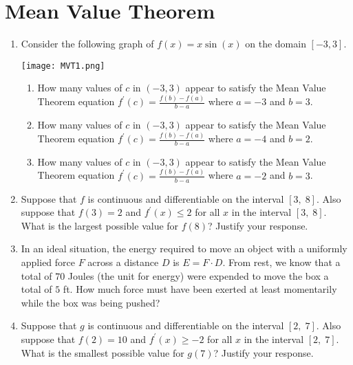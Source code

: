 \documentclass[12pt]{report}
\begin{document}
\newcommand{\less}{\textless}
\newcommand{\greater}{\textgreater}
\newcommand{\reals}{\mathbb{R}}
\newcommand{\integers}{\mathbb{Z}}
\newcommand{\rationals}{\mathbb{Q}}
\newcommand{\dsp}{\displaystyle}

\section*{Mean Value Theorem}

\begin{enumerate}

\item Consider the following graph of $f(x) = x\sin(x)$ on the domain $[-3, 3]$. 
\begin{center}
\texttt{[image: MVT1.png]}
\end{center}
\begin{enumerate}
\item How many values of $c$ in $(-3, 3)$ appear to satisfy the Mean Value Theorem equation \newline $\dsp f^\prime(c) = \frac{f(b)-f(a)}{b-a}$ where $a = -3$ and $b = 3$.

\item How many values of $c$ in $(-3, 3)$ appear to satisfy the Mean Value Theorem equation \newline $\dsp f^\prime(c) = \frac{f(b)-f(a)}{b-a}$ where $a = -4$ and $b = 2$.

\item How many values of $c$ in $(-3, 3)$ appear to satisfy the Mean Value Theorem equation \newline $\dsp f^\prime(c) = \frac{f(b)-f(a)}{b-a}$ where $a = -2$ and $b = 3$.
\end{enumerate}

\item  Suppose that $f$ is continuous and differentiable on the interval $[3, \; 8]$. Also suppose that $f(3) = 2$ and $f^\prime(x) \le 2$ for all $x$ in the interval $[3, \; 8]$. What is the largest possible value for $f(8)$? Justify your response.

\item In an ideal situation, the energy required to move an object with a uniformly applied force $F$ across a distance $D$ is $E=F\cdot D$. From rest, we know that a total of $70$ Joules (the unit for energy) were expended to move the box a total of $5$ ft. How much force must have been exerted at least momentarily while the box was being pushed?

\item  Suppose that $g$ is continuous and differentiable on the interval $[2, \; 7]$. Also suppose that $f(2) = 10$ and $f^\prime(x) \geq -2$ for all $x$ in the interval $[2, \; 7]$. What is the smallest possible value for $g(7)$? Justify your response.

\end{enumerate}
\end{document}
